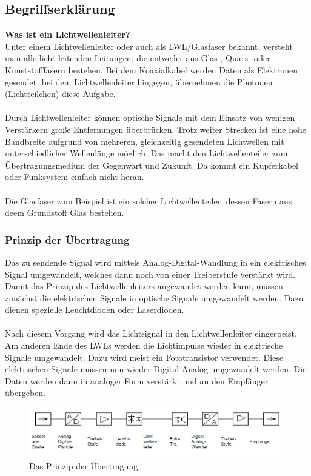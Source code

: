 \documentclass[11pt, a4paper]{article}
\begin{document}
\subsection{Begriffserklärung}
\textbf{Was ist ein Lichtwellenleiter?}\\
Unter einem Lichtwellenleiter oder auch als LWL/Glasfaser bekannt, versteht man alle licht-leitenden Leitungen, die entweder aus Glas-, Quarz- oder Kunststofffasern bestehen. Bei dem Koaxialkabel werden Daten als Elektronen gesendet, bei dem Lichtwellenleiter hingegen,
übernehmen die Photonen (Lichtteilchen) diese Aufgabe. \\ \\
Durch Lichtwellenleiter können optische Signale mit dem Einsatz von wenigen Verstärkern große Entfernungen überbrücken. Trotz weiter Strecken ist eine hohe Bandbreite aufgrund von mehreren, gleichzeitig gesendeten Lichtwellen mit unterschiedlicher Wellenlänge möglich. Das macht den Lichtwellenteiler zum Übertragungsmedium der Gegenwart und Zukunft. Da kommt ein Kupferkabel oder Funksystem einfach nicht heran. \\ \\
Die Glasfaser zum Beispiel ist ein solcher Lichtwellenteiler, dessen Fasern aus deem Grundstoff Glas bestehen.

\newpage
\subsubsection{Prinzip der Übertragung}
Das zu sendende Signal wird mittels Analog-Digital-Wandlung in ein elektrisches Signal umgewandelt,
welches dann noch von einer Treiberstufe verstärkt wird. Damit das Prinzip des Lichtwellenleiters angewandet werden kann, müssen zunächst die elektrischen Signale in optische Signale umgewandelt werden. Dazu dienen spezielle Leuchtdioden oder Laserdioden. \\ \\
Nach diesem Vorgang wird das Lichtsignal in den Lichtwellenleiter eingespeist. Am anderen Ende des LWLs werden die Lichtimpulse wieder in elektrische Signale umgewandelt. Dazu wird meist ein Fototransistor verwendet. Diese elektrischen Signale müssen nun wieder Digital-Analog umgewandelt werden. Die Daten werden dann in analoger Form verstärkt und an den Empfänger übergeben.

\begin{figure}[h!]
	\centering
	\includegraphics[width=1.0\textwidth]{images/lwl2}
	\caption{Das Prinzip der Übertragung \cite{lwl-uebertragung-img}}
\end{figure}
\end{document}
